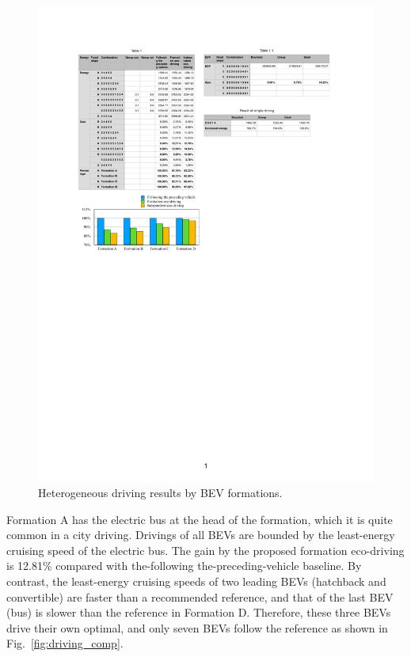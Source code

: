 \documentclass{IEEEtran}
\begin{document}
\begin{figure}	%
\centering
\includegraphics[width=1.0\hsize]{Figures/Bar_graph.pdf}
\caption{Heterogeneous driving results by BEV formations.}
\label{fig:bar_graph}
\end{figure} 



Formation A has the electric bus at the head of the formation, which it is quite common in a city driving. Drivings of all BEVs are bounded by the least-energy cruising speed of the electric bus. The gain by the proposed formation eco-driving is 12.81\% compared with the-following the-preceding-vehicle baseline.
By contrast, the least-energy cruising speeds of two leading BEVs (hatchback and convertible) are faster than a recommended reference, and that of the last BEV (bus) is slower than the reference in Formation D. Therefore, these three BEVs drive their own optimal, and only seven BEVs follow the reference as shown in Fig.~\ref{fig:driving_comp}.
\end{document}
